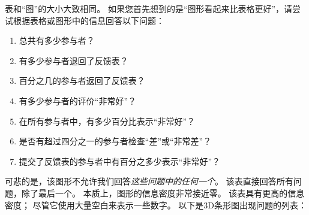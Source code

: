 
表和``图''的大小大致相同。 如果您首先想到的是``图形看起来比表格更好''，请尝试根据表格或图形中的信息回答以下问题：

%
\begin{enumerate}
    \item 总共有多少参与者？
    \item 有多少参与者退回了反馈表？
    \item 百分之几的参与者返回了反馈表？
    \item 有多少参与者的评价``非常好''？
    \item 在所有参与者中，有多少百分比表示``非常好''？
    \item 是否有超过四分之一的参与者检查``差''或``非常差''？
    \item 提交了反馈表的参与者中有百分之多少表示``非常好''？
\end{enumerate}


可悲的是，该图形不允许我们回答\emph{这些问题中的任何一个}。 该表直接回答所有问题，除了最后一个。 本质上，图形的信息密度非常接近零。 该表具有更高的信息密度； 尽管它使用大量空白来表示一些数字。 以下是3D条形图出现问题的列表：

